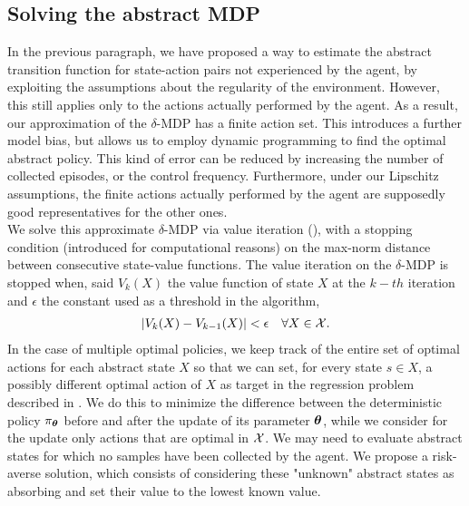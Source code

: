 \subsection{Solving the abstract MDP}\label{subsec:solvmdp}
In the previous paragraph, we have proposed a way to estimate the abstract transition function for state-action pairs not experienced by the agent, by exploiting the assumptions about the regularity of the environment. However, this still applies only to the actions actually performed by the agent. As a result, our approximation of the $\delta$-\ac{MDP} has a finite action set. This introduces a further model bias, but allows us to employ dynamic programming to find the optimal abstract policy. This kind of error can be reduced by increasing the number of collected episodes, or the control frequency. Furthermore, under our Lipschitz assumptions, the finite actions actually performed by the agent are supposedly good representatives for the other ones.\\
\newline
We solve this approximate $\delta$-\ac{MDP} via value iteration (), with a stopping condition (introduced for computational reasons) on the max-norm distance between consecutive state-value functions.
The value iteration on the $\delta$-\ac{MDP} is stopped when, said $V_k(X)$ the value function of state $X$ at the $k-th$ iteration and $\epsilon$ the constant used as a threshold in the algorithm, 
\begin{align}
|V_k(X) - V_{k-1}(X)| < \epsilon \quad \forall X \in \mathcal{X}.
\end{align}
In the case of multiple optimal policies, we keep track of the entire set of optimal actions for each abstract state $X$ so that we can set, for every state $s \in X$, a possibly different optimal action of $X$ as target in the regression problem described in . We do this to minimize the difference between the deterministic policy $\pi_{\boldsymbol{\theta}}$ before and after the update of its parameter $\boldsymbol{\theta}$, while we consider for the update only actions that are optimal in $\mathcal{X}$.
We may need to evaluate abstract states for which no samples have been collected by the agent. We propose a risk-averse solution, which consists of considering these "unknown" abstract states as absorbing and set their value to the lowest known value. 

